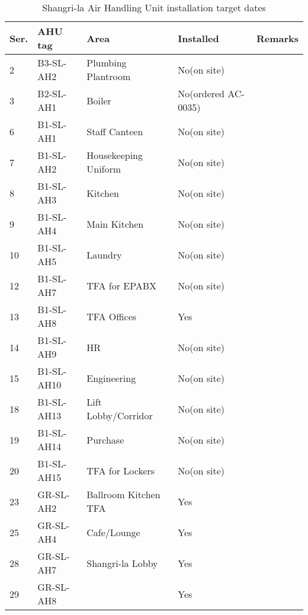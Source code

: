 \begin{table}[htbp]
\label{tbl:AHUSL}
\footnotesize
\caption{Shangri-la Air Handling Unit installation target dates}
\begin{tabular}{llp{3.2cm}p{3.0cm}l}
\toprule
 Ser.	 	 &AHU tag 	 &Area	 			&Installed	 &Remarks \\
\midrule

 
 2	 	 &B3-SL-AH2	 &Plumbing Plantroom	 	 &No(on site)	 & \ahuthree\\
\midrule
 3	 	 &B2-SL-AH1     &Boiler	 	  	 &No(ordered AC-0035)  &\ahuverylate\\
 
\midrule

 6	 	 &B1-SL-AH1	 &Staff Canteen		  &No(on site)   &\ahufive \\
 7	 	 &B1-SL-AH2	 &Housekeeping Uniform	  &No(on site)   &\ahufive \\
 8	 	 &B1-SL-AH3	 &Kitchen		 	  &No(on site)   &\ahufive \\
 9	 	 &B1-SL-AH4	 &Main Kitchen	 		  &No(on site)  &\ahufive \\
 10	 	 &B1-SL-AH5	 &Laundry	 	 	  &No(on site)  &\ahufive \\

 12	 	 &B1-SL-AH7    &TFA for EPABX		  &No(on site)  &\ahufive \\
 13	 	 &B1-SL-AH8	 &TFA Offices	            	  &Yes	            &\ahufive \\
 14	 	 &B1-SL-AH9	 &HR	 	 		  &No(on site)  &\ahufive \\
 15	 	 &B1-SL-AH10	 &Engineering	 	 	  &No(on site)  &\ahufive \\
 
 18	 	 &B1-SL-AH13	 &Lift Lobby/Corridor	 	 &No(on site)  &\ahufive \\
 19	 	 &B1-SL-AH14	 &Purchase	 	 	 &No(on site)  &\ahufive \\
 20	 	 &B1-SL-AH15	 &TFA for Lockers	 	 &No(on site)  &\ahufive \\

\midrule

 
 23	 	 &GR-SL-AH2	 &Ballroom Kitchen TFA	 &Yes &\\

 25	 	 &GR-SL-AH4	 &Cafe/Lounge	 	&Yes &\\
 
 28	 	 &GR-SL-AH7	 &Shangri-la Lobby	 	&Yes &\\
 29	 	 &GR-SL-AH8	 &	 	 	 	&Yes &\\
\midrule



\end{tabular}
\end{table}
